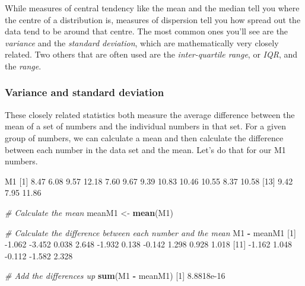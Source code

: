 \documentclass[
]{book}
\newenvironment{Shaded}{\begin{snugshade}}{\end{snugshade}}
\newcommand{\CommentTok}[1]{\textcolor[rgb]{0.56,0.35,0.01}{\textit{#1}}}
\newcommand{\DecValTok}[1]{\textcolor[rgb]{0.00,0.00,0.81}{#1}}
\newcommand{\FloatTok}[1]{\textcolor[rgb]{0.00,0.00,0.81}{#1}}
\newcommand{\KeywordTok}[1]{\textcolor[rgb]{0.13,0.29,0.53}{\textbf{#1}}}
\newcommand{\NormalTok}[1]{#1}
\newcommand{\OperatorTok}[1]{\textcolor[rgb]{0.81,0.36,0.00}{\textbf{#1}}}
\newcommand{\StringTok}[1]{\textcolor[rgb]{0.31,0.60,0.02}{#1}}
\begin{document}
While measures of central tendency like the mean and the median tell you where the centre of a distribution is, measures of dispersion tell you how spread out the data tend to be around that centre. The most common ones you'll see are the \emph{variance} and the \emph{standard deviation}, which are mathematically very closely related. Two others that are often used are the \emph{inter-quartile range}, or \emph{IQR}, and the \emph{range}.

\hypertarget{variance-and-standard-deviation}{%
\subsubsection{Variance and standard deviation}\label{variance-and-standard-deviation}}

These closely related statistics both measure the average difference between the mean of a set of numbers and the individual numbers in that set. For a given group of numbers, we can calculate a mean and then calculate the difference between each number in the data set and the mean. Let's do that for our M1 numbers.

\begin{Shaded}
\begin{Highlighting}[]
\NormalTok{M1}
\NormalTok{ [}\DecValTok{1}\NormalTok{]  }\FloatTok{8.47}  \FloatTok{6.08}  \FloatTok{9.57} \FloatTok{12.18}  \FloatTok{7.60}  \FloatTok{9.67}  \FloatTok{9.39} \FloatTok{10.83} \FloatTok{10.46} \FloatTok{10.55}  \FloatTok{8.37} \FloatTok{10.58}
\NormalTok{[}\DecValTok{13}\NormalTok{]  }\FloatTok{9.42}  \FloatTok{7.95} \FloatTok{11.86}

\CommentTok{# Calculate the mean}
\NormalTok{meanM1 <-}\StringTok{ }\KeywordTok{mean}\NormalTok{(M1)}

\CommentTok{# Calculate the difference between each number and the mean}
\NormalTok{M1 }\OperatorTok{-}\StringTok{ }\NormalTok{meanM1}
\NormalTok{ [}\DecValTok{1}\NormalTok{] }\FloatTok{-1.062} \FloatTok{-3.452}  \FloatTok{0.038}  \FloatTok{2.648} \FloatTok{-1.932}  \FloatTok{0.138} \FloatTok{-0.142}  \FloatTok{1.298}  \FloatTok{0.928}  \FloatTok{1.018}
\NormalTok{[}\DecValTok{11}\NormalTok{] }\FloatTok{-1.162}  \FloatTok{1.048} \FloatTok{-0.112} \FloatTok{-1.582}  \FloatTok{2.328}

\CommentTok{# Add the differences up}
\KeywordTok{sum}\NormalTok{(M1 }\OperatorTok{-}\StringTok{ }\NormalTok{meanM1)}
\NormalTok{[}\DecValTok{1}\NormalTok{] }\FloatTok{8.8818e-16}
\end{Highlighting}
\end{Shaded}
\end{document}
